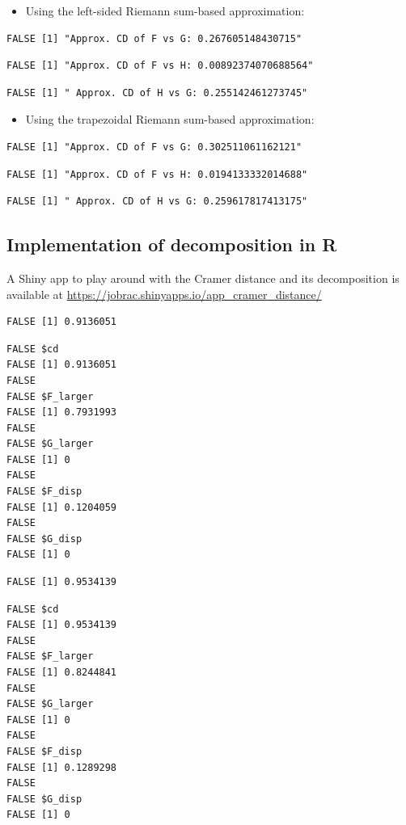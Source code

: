 \documentclass[
]{article}
\providecommand{\tightlist}{%
  \setlength{\itemsep}{0pt}\setlength{\parskip}{0pt}}
\begin{document}
\begin{itemize}
\tightlist
\item
  Using the left-sided Riemann sum-based approximation:
\end{itemize}

\begin{verbatim}
FALSE [1] "Approx. CD of F vs G: 0.267605148430715"
\end{verbatim}

\begin{verbatim}
FALSE [1] "Approx. CD of F vs H: 0.00892374070688564"
\end{verbatim}

\begin{verbatim}
FALSE [1] " Approx. CD of H vs G: 0.255142461273745"
\end{verbatim}

\begin{itemize}
\tightlist
\item
  Using the trapezoidal Riemann sum-based approximation:
\end{itemize}

\begin{verbatim}
FALSE [1] "Approx. CD of F vs G: 0.302511061162121"
\end{verbatim}

\begin{verbatim}
FALSE [1] "Approx. CD of F vs H: 0.0194133332014688"
\end{verbatim}

\begin{verbatim}
FALSE [1] " Approx. CD of H vs G: 0.259617817413175"
\end{verbatim}

\hypertarget{implementation-of-decomposition-in-r}{%
\subsection{Implementation of decomposition in
R}\label{implementation-of-decomposition-in-r}}

A Shiny app to play around with the Cramer distance and its
decomposition is available at
\url{https://jobrac.shinyapps.io/app_cramer_distance/}

\begin{verbatim}
FALSE [1] 0.9136051
\end{verbatim}

\begin{verbatim}
FALSE $cd
FALSE [1] 0.9136051
FALSE 
FALSE $F_larger
FALSE [1] 0.7931993
FALSE 
FALSE $G_larger
FALSE [1] 0
FALSE 
FALSE $F_disp
FALSE [1] 0.1204059
FALSE 
FALSE $G_disp
FALSE [1] 0
\end{verbatim}

\begin{verbatim}
FALSE [1] 0.9534139
\end{verbatim}

\begin{verbatim}
FALSE $cd
FALSE [1] 0.9534139
FALSE 
FALSE $F_larger
FALSE [1] 0.8244841
FALSE 
FALSE $G_larger
FALSE [1] 0
FALSE 
FALSE $F_disp
FALSE [1] 0.1289298
FALSE 
FALSE $G_disp
FALSE [1] 0
\end{verbatim}
\end{document}
